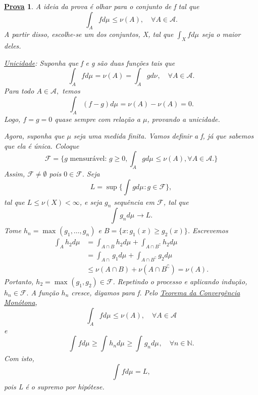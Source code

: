 \documentclass{article}
\newtheorem*{proof*}{\underline{Prova}}
\begin{document}
 \begin{proof*}
   A ideia da prova é olhar para o conjunto de f tal que 
     \[
       \int_{A}f d\mu_{} \leq \nu(A),\quad \forall A\in \mathcal{A}.
     \]
    A partir disso, escolhe-se um dos conjuntos, X, tal que \(\int_{X}f d\mu_{}\) seja o maior deles. 

  \textit{\underline{Unicidade}:} Suponha que f e g são duas funções tais que 
    \[
      \int_{A}f d\mu_{} = \nu (A) = \int_{A}g d\nu_{},\quad \forall A\in \mathcal{A}.
    \]
  Para todo \(A\in \mathcal{A},\) temos 
    \[
      \int_{A}(f-g) d\mu_{} = \nu (A) - \nu(A) = 0.
    \]
  Logo, \(f = g = 0\) quase sempre com relação a \(\mu \), provando a unicidade.

  Agora, suponha que \(\mu \) seja uma medida finita. Vamos definir a f, já que sabemos que ela é única. Coloque 
    \[
      \mathcal{F} = \{g \text{ mensurável: } g\geq 0, \int_{A}g d\mu_{}\leq \nu (A), \forall A\in \mathcal{A}.\}
    \]
  Assim, \(\mathcal{F}\neq\emptyset\) pois \(0\in \mathcal{F}.\) Seja 
    \[
      L = \sup_{}\biggl\{\int_{}g d\mu_{}: g\in \mathcal{F}\biggr\},
    \]
  tal que \(L\leq \nu (X) < \infty\), e seja \(g_{n}\) sequência em \(\mathcal{F}\), tal que 
    \[
      \int_{}g_{n} d\mu_{}\to L.
    \]
    Tome \(h_{n} = \max_{}(g_1, \dotsc , g_{n})\) e \(B = \{x: g_1(x) \geq g_2(x)\}\). Escrevemos 
   \begin{align*}
     \int_{A}h_2 d\mu_{} &= \int_{A\cap B}h_2 d\mu_{} + \int_{A\cap B ^{\complement}}h_2 d\mu_{}\\ 
                         &= \int_{A\cap }g_1 d\mu_{} + \int_{A\cap B ^{\complement}}g_2 d\mu_{}\\ 
                         &\leq \nu (A\cap B) + \nu (A\cap B ^{\complement}) = \nu (A).
   \end{align*}
  Portanto, \(h_2=\max_{}(g_1, g_2)\in \mathcal{F}\). Repetindo o processo e aplicando indução, \(h_{n}\in \mathcal{F}.\) A função \(h_{n}\) cresce, digamos para f. Pelo \hyperlink{monotone_convergence}{\textit{Teorema da Convergência Monótona}},
    \[
      \int_{A}f d\mu_{}\leq \nu (A), \quad \forall A\in \mathcal{A}
    \]
  e 
    \[
      \int_{}f d\mu_{} \geq \int_{}h_{n} d\mu_{}\geq \int_{}g_{n} d\mu_{},\quad \forall n\in \mathbb{N}.
    \]
  Com isto, 
    \[
      \int_{}f d\mu_{} = L,
    \]
  pois L é o supremo por hipótese. 


\end{proof*}
\end{document}
